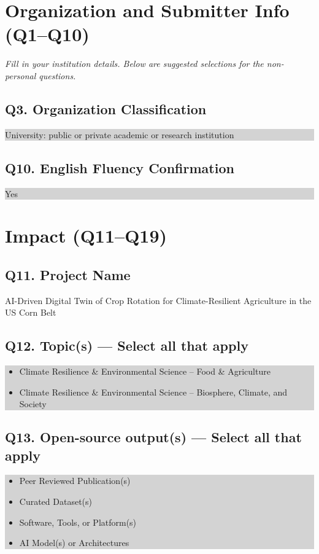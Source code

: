 \documentclass[11pt,letterpaper]{article}
\newcommand{\answer}[1]{%
    \vspace{0.2em}%
    \noindent\colorbox{answerbox}{\parbox{\dimexpr\textwidth-2\fboxsep}{%
        \vspace{0.4em}#1\vspace{0.4em}%
    }}%
    \vspace{0.5em}%
}
\newcommand{\selection}[1]{%
    \vspace{0.2em}%
    \noindent\colorbox{lightgray}{\parbox{\dimexpr\textwidth-2\fboxsep}{%
        \vspace{0.3em}#1\vspace{0.3em}%
    }}%
    \vspace{0.5em}%
}
\newcommand{\note}[1]{%
    \vspace{0.2em}%
    {\small\textcolor{notegray}{\textit{#1}}}%
    \vspace{0.2em}%
}
\begin{document}
\section{Organization and Submitter Info (Q1--Q10)}

\note{Fill in your institution details. Below are suggested selections for the non-personal questions.}

\subsection{Q3. Organization Classification}
\selection{University: public or private academic or research institution}

\subsection{Q10. English Fluency Confirmation}
\selection{Yes}

\section{Impact (Q11--Q19)}

\subsection{Q11. Project Name}
\answer{AI-Driven Digital Twin of Crop Rotation for Climate-Resilient Agriculture in the US Corn Belt}

\subsection{Q12. Topic(s) --- Select all that apply}
\selection{
\begin{itemize}[nosep,leftmargin=1.5em]
    \item[$\boxtimes$] Climate Resilience \& Environmental Science -- Food \& Agriculture
    \item[$\boxtimes$] Climate Resilience \& Environmental Science -- Biosphere, Climate, and Society
\end{itemize}
}

\subsection{Q13. Open-source output(s) --- Select all that apply}
\selection{
\begin{itemize}[nosep,leftmargin=1.5em]
    \item[$\boxtimes$] Peer Reviewed Publication(s)
    \item[$\boxtimes$] Curated Dataset(s)
    \item[$\boxtimes$] Software, Tools, or Platform(s)
    \item[$\boxtimes$] AI Model(s) or Architectures
\end{itemize}
}
\end{document}
